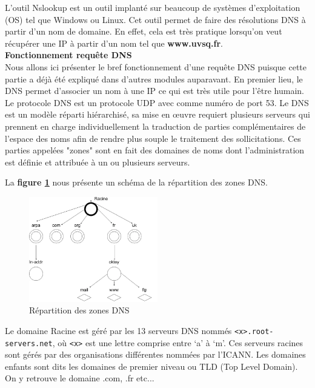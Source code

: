 L'outil Nslookup est un outil implanté sur beaucoup de systèmes d'exploitation (OS) tel que Windows ou Linux. Cet outil permet de faire des résolutions DNS à partir d'un nom de domaine. En effet, cela est très pratique lorsqu'on veut récupérer une IP à partir d'un nom tel que \textbf{www.uvsq.fr}.\\

\noindent \textbf{Fonctionnement requête DNS}\\

Nous allons ici présenter le bref fonctionnement d'une requête DNS puisque cette partie a déjà été expliqué dans d'autres modules auparavant. En premier lieu, le DNS permet d'associer un nom à une IP ce qui est très utile pour l'être humain.\\

\noindent Le protocole DNS est un protocole UDP avec comme numéro de port 53. Le DNS est un modèle réparti hiérarchisé, sa mise en œuvre requiert plusieurs serveurs qui prennent en charge individuellement la traduction de parties complémentaires de l’espace des noms afin de rendre plus souple le traitement des sollicitations. Ces parties appelées "zones" sont en fait des domaines de noms dont l’administration est définie et attribuée à un ou plusieurs serveurs.

\noindent La \textbf{figure \ref{fig:repartitiondns}} nous présente un schéma de la répartition des zones DNS.

\begin{figure}[htp!]
  \centering
  \setlength\figureheight{7cm}
  \setlength\figurewidth{9cm}
  \includegraphics[width=0.5\textwidth]{oui/images/Nslookup/dns.png}
  \caption{Répartition des zones DNS}
  \label{fig:repartitiondns}
\end{figure}

\noindent Le domaine Racine est géré par les 13 serveurs DNS nommés \lstinline{<x>.root-servers.net}, où \lstinline{<x>} est une lettre comprise entre ‘a’ à ‘m’. Ces serveurs racines sont gérés par des organisations différentes nommées par l’ICANN. Les domaines enfants sont dits les domaines de premier niveau ou TLD (Top Level Domain). On y retrouve le domaine .com, .fr etc...\\

